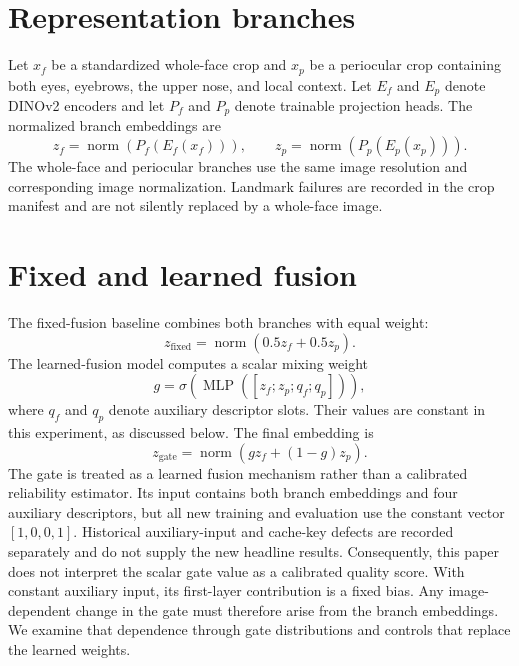 \documentclass[12pt,a4paper,oneside]{report}
\begin{document}
\section{Representation branches}
Let $x_f$ be a standardized whole-face crop and $x_p$ be a periocular crop containing both eyes, eyebrows, the upper nose, and local context. Let $E_f$ and $E_p$ denote DINOv2 encoders and let $P_f$ and $P_p$ denote trainable projection heads. The normalized branch embeddings are
\begin{equation}
 z_f=\operatorname{norm}(P_f(E_f(x_f))),\qquad z_p=\operatorname{norm}(P_p(E_p(x_p))).
\end{equation}
The whole-face and periocular branches use the same image resolution and corresponding image normalization. Landmark failures are recorded in the crop manifest and are not silently replaced by a whole-face image.

\section{Fixed and learned fusion}
The fixed-fusion baseline combines both branches with equal weight:
\begin{equation}
 z_{\mathrm{fixed}}=\operatorname{norm}(0.5z_f+0.5z_p).
\end{equation}
The learned-fusion model computes a scalar mixing weight
\begin{equation}
 g=\sigma\left(\operatorname{MLP}([z_f;z_p;q_f;q_p])\right),
\end{equation}
where $q_f$ and $q_p$ denote auxiliary descriptor slots. Their values are constant in this experiment, as discussed below. The final embedding is
\begin{equation}
 z_{\mathrm{gate}}=\operatorname{norm}(gz_f+(1-g)z_p).
\end{equation}
The gate is treated as a learned fusion mechanism rather than a calibrated reliability estimator. Its input contains both branch embeddings and four auxiliary descriptors, but all new training and evaluation use the constant vector $[1,0,0,1]$. Historical auxiliary-input and cache-key defects are recorded separately and do not supply the new headline results. Consequently, this paper does not interpret the scalar gate value as a calibrated quality score. With constant auxiliary input, its first-layer contribution is a fixed bias. Any image-dependent change in the gate must therefore arise from the branch embeddings. We examine that dependence through gate distributions and controls that replace the learned weights.
\end{document}
